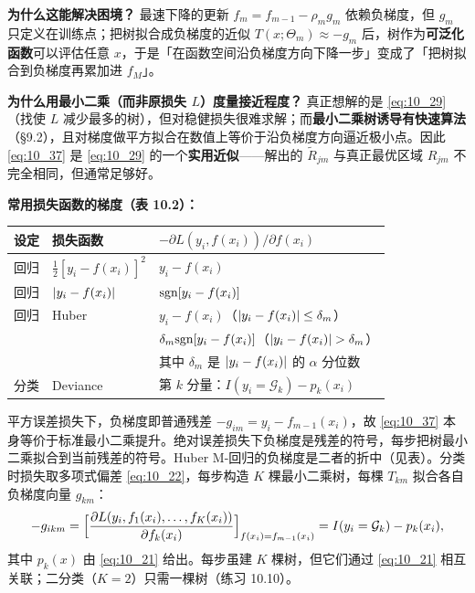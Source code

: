 \textbf{为什么这能解决困境？} 最速下降的更新 $f_m = f_{m-1} - \rho_m g_m$ 依赖负梯度，但 $g_m$ 只定义在训练点；把树拟合成负梯度的近似 $T(x;\Theta_m) \approx -g_m$ 后，树作为\textbf{可泛化函数}可以评估任意 $x$，于是「在函数空间沿负梯度方向下降一步」变成了「把树拟合到负梯度再累加进 $f_M$」。

\textbf{为什么用最小二乘（而非原损失 $L$）度量接近程度？} 真正想解的是 \eqref{eq:10_29}（找使 $L$ 减少最多的树），但对稳健损失很难求解；而\textbf{最小二乘树诱导有快速算法}（§9.2），且对梯度做平方拟合在数值上等价于沿负梯度方向逼近极小点。因此 \eqref{eq:10_37} 是 \eqref{eq:10_29} 的一个\textbf{实用近似}——解出的 $\tilde R_{jm}$ 与真正最优区域 $R_{jm}$ 不完全相同，但通常足够好。

\textbf{常用损失函数的梯度（表 10.2）：}
\begin{center}
\begin{tabular}{lll}
\toprule
\textbf{设定} & \textbf{损失函数} & $-\partial L(y_i, f(x_i))/\partial f(x_i)$ \\
\midrule
回归 & $\frac{1}{2}[y_i - f(x_i)]^2$ & $y_i - f(x_i)$ \\
回归 & $\left\lvert y_i - f(x_i)\right\rvert$ & $\mathrm{sgn}[y_i - f(x_i)]$ \\
回归 & Huber & $y_i - f(x_i)$（$\left\lvert y_i - f(x_i)\right\rvert \le \delta_m$）\\
     &  & $\delta_m \mathrm{sgn}[y_i - f(x_i)]$（$\left\lvert y_i - f(x_i)\right\rvert > \delta_m$）\\
     &  & 其中 $\delta_m$ 是 $\left\lvert y_i - f(x_i)\right\rvert$ 的 $\alpha$ 分位数 \\
分类 & Deviance & 第 $k$ 分量：$I(y_i = \mathcal{G}_k) - p_k(x_i)$ \\
\bottomrule
\end{tabular}
\end{center}
平方误差损失下，负梯度即普通残差 $-g_{im} = y_i - f_{m-1}(x_i)$，故 \eqref{eq:10_37} 本身等价于标准最小二乘提升。绝对误差损失下负梯度是残差的符号，每步把树最小二乘拟合到当前残差的符号。Huber M-回归的负梯度是二者的折中（见表）。分类时损失取多项式偏差 \eqref{eq:10_22}，每步构造 $K$ 棵最小二乘树，每棵 $T_{km}$ 拟合各自负梯度向量 $g_{km}$：
\begin{equation}\label{eq:10_38}
    -g_{ikm} = \Bigl[\frac{\partial L(y_i, f_1(x_i), \ldots, f_K(x_i))}{\partial f_k(x_i)}\Bigr]_{f(x_i) = f_{m-1}(x_i)} = I(y_i = \mathcal{G}_k) - p_k(x_i),
\end{equation}
其中 $p_k(x)$ 由 \eqref{eq:10_21} 给出。每步虽建 $K$ 棵树，但它们通过 \eqref{eq:10_21} 相互关联；二分类（$K = 2$）只需一棵树（练习 10.10）。


